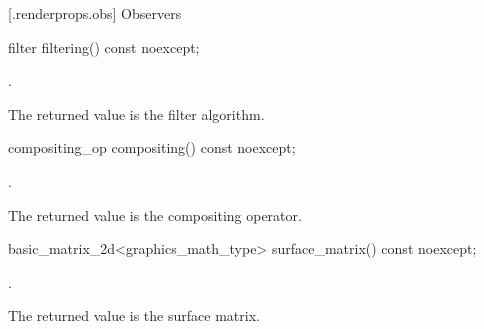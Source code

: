  [\iotwod.renderprops.obs] {Observers}

%
\begin{itemdecl}
filter filtering() const noexcept;
\end{itemdecl}
\begin{itemdescr}
\pnum
\returns
{}.

\pnum
\remarks
The returned value is the filter algorithm.
\end{itemdescr}

%
\begin{itemdecl}
compositing_op compositing() const noexcept;
\end{itemdecl}
\begin{itemdescr}
\pnum
\returns
{}.

\pnum
\remarks
The returned value is the compositing operator.
\end{itemdescr}

%
\begin{itemdecl}
basic_matrix_2d<graphics_math_type> surface_matrix() const noexcept;
\end{itemdecl}
\begin{itemdescr}
\pnum
\returns
{}.

\pnum
\remarks
The returned value is the surface matrix.
\end{itemdescr}
